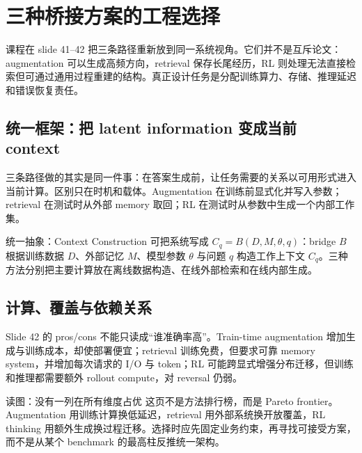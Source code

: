 \section{三种桥接方案的工程选择}

课程在 slide 41--42 把三条路径重新放到同一系统视角。它们并不是互斥论文：augmentation 可以生成高频方向，retrieval 保存长尾经历，RL 则处理无法直接检索但可通过通用过程重建的结构。真正设计任务是分配训练算力、存储、推理延迟和错误恢复责任。

\subsection{统一框架：把 latent information 变成当前 context}

三条路径做的其实是同一件事：在答案生成前，让任务需要的关系以可用形式进入当前计算。区别只在时机和载体。Augmentation 在训练前显式化并写入参数；retrieval 在测试时从外部 memory 取回；RL 在测试时从参数中生成一个内部工作集。


\begin{importantbox}{统一抽象：Context Construction}
可把系统写成 $C_q=B(D,M,\theta,q)$：bridge $B$ 根据训练数据 $D$、外部记忆 $M$、模型参数 $\theta$ 与问题 $q$ 构造工作上下文 $C_q$。三种方法分别把主要计算放在离线数据构造、在线外部检索和在线内部生成。
\end{importantbox}

\subsection{计算、覆盖与依赖关系}

Slide 42 的 pros/cons 不能只读成“谁准确率高”。Train-time augmentation 增加生成与训练成本，却使部署便宜；retrieval 训练免费，但要求可靠 memory system，并增加每次请求的 I/O 与 token；RL 可能跨显式增强分布迁移，但训练和推理都需要额外 rollout compute，对 reversal 仍弱。


\begin{knowledgebox}{读图：没有一列在所有维度占优}
这页不是方法排行榜，而是 Pareto frontier。Augmentation 用训练计算换低延迟，retrieval 用外部系统换开放覆盖，RL thinking 用额外生成换过程迁移。选择时应先固定业务约束，再寻找可接受方案，而不是从某个 benchmark 的最高柱反推统一架构。
\end{knowledgebox}

